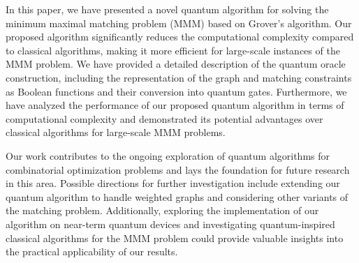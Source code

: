 In this paper, we have presented a novel quantum algorithm for solving the minimum maximal matching problem (MMM) based on Grover's algorithm. Our proposed algorithm significantly reduces the computational complexity compared to classical algorithms, making it more efficient for large-scale instances of the MMM problem. We have provided a detailed description of the quantum oracle construction, including the representation of the graph and matching constraints as Boolean functions and their conversion into quantum gates. Furthermore, we have analyzed the performance of our proposed quantum algorithm in terms of computational complexity and demonstrated its potential advantages over classical algorithms for large-scale MMM problems.

Our work contributes to the ongoing exploration of quantum algorithms for combinatorial optimization problems and lays the foundation for future research in this area. Possible directions for further investigation include extending our quantum algorithm to handle weighted graphs and considering other variants of the matching problem. Additionally, exploring the implementation of our algorithm on near-term quantum devices and investigating quantum-inspired classical algorithms for the MMM problem could provide valuable insights into the practical applicability of our results.

